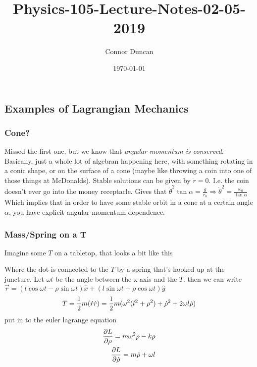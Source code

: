 \documentclass{article} \usepackage{amsmath} \usepackage{amssymb} \usepackage{amsthm} \usepackage[margin=0.2in]{geometry} \usepackage{hyperref} \usepackage{physics} \usepackage{tikz} \usepackage{mathtools} \mathtoolsset{showonlyrefs} \theoremstyle{definition} \newtheorem{theorem}{Theorem}[section] \newtheorem{corollary}{Corollary}[theorem] \newtheorem{lemma}[theorem]{Lemma} \newtheorem{definition}{Definition}[section] \author{Connor Duncan} \date{\today}
\title{Physics-105-Lecture-Notes-02-05-2019}
\begin{document}
\maketitle\tableofcontents
\noindent{}
\subsection{Examples of Lagrangian Mechanics} \subsubsection{Cone?} Missed the first one, but we know that \emph{angular momentum is conserved}. Basically, just a whole lot of algebran happening here, with something rotating in a conic shape, or on the surface of a cone (maybe like throwing a coin into one of those things at McDonalds). Stable solutions can be given by $\ddot r=0$. I.e. the coin doesn't ever go into the money receptacle. Gives that $\dot\theta^2\tan\alpha=\frac{g}{r_0}\Rightarrow\dot\theta^2=\frac{\omega_0}{\tan\alpha}$ Which implies that in order to have some stable orbit in a cone at a certain angle $\alpha$, you have explicit angular momentum dependence. \begin{center}  \end{center} \subsubsection{Mass/Spring on a T} Imagine some $T$ on a tabletop, that looks a bit like this \begin{center}  \end{center} Where the dot is connected to the $T$ by a spring that's hooked up at the juncture. Let $\omega t$ be the angle between the x-axis and the $T$. then we can write $\vec{r}=(l\cos\omega t-\rho\sin\omega t)\hat x+(l\sin\omega t+\rho\cos\omega t)\hat y$ \begin{equation} T=\frac{1}{2}m(\dot r\dot r)=\frac{1}{2}m(\omega^2(l^2+\rho^2)+\dot\rho^2+2\omega l\dot\rho)\\ \end{equation} put in to the euler lagrange equation \begin{align} \pdv{L}{\rho}=m\omega^2\rho-k\rho\\ \pdv{L}{\dot\rho}=m\dot\rho+\omega l\\ \end{align} 
\end{document}
